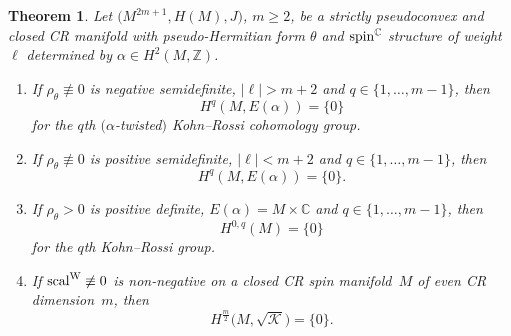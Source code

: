 \documentclass[10pt,a4paper]{amsart}
\numberwithin{equation}{section}
\newtheorem{Theorem}{Theorem}[section]
\newcommand{\ZZ}{\mathbb{Z}}
\newcommand{\CC}{\mathbb{C}}
\begin{document}
\begin{Theorem} \label{VanKR} Let $\big(M^{2m+1}, H(M),J\big)$, $m\geq 2$, be a strictly pseudoconvex and closed CR manifold
with pseudo-Hermitian form $\theta$ and ${\rm spin}^\CC$ structure of weight~$\ell$ determined by $\alpha\in H^2(M,\ZZ)$.
\begin{enumerate}\itemsep=0pt
\item[$1.$] If $\rho_\theta\not\equiv 0$ is negative semidefinite, $|\ell|>m+2$ and $q\in\{1,\dots,m-1\}$, then
\[
H^q(M,E(\alpha)) = \{0\}
\]
for the $q$th $(\alpha$-twisted$)$ Kohn--Rossi cohomology group.
\item[$2.$] If $\rho_\theta\not\equiv 0$ is positive semidefinite, $|\ell|<m+2$ and $q\in\{1,\dots,m-1\}$, then
\[
H^q(M,E(\alpha)) = \{0\}.
\]
\item[$3.$] If $\rho_\theta>0$ is positive definite, $E(\alpha)=M\times\CC$ and $q\in\{1,\dots,m-1\}$, then
\[
H^{0,q}(M) = \{0\}
\]
for the $q$th Kohn--Rossi group.
\item[$4.$] If ${\rm scal}^{\rm W}\not\equiv 0$ is non-negative on a closed CR spin manifold~$M$ of even CR dimension~$m$, then
\[
H^{\frac{m}{2}}\big(M,\sqrt{\mathcal{K}}\big) = \{0\}.
\]
\end{enumerate}
\end{Theorem}
\end{document}
